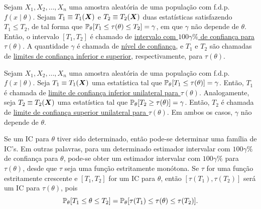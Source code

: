 

\begin{definition}
Sejam $X_1,X_2,\ldots,X_n$ uma amostra aleatória de uma população com f.d.p. $f(x\mid\theta)$. Sejam $T_1\equiv T_1(\v{X})$ e $T_2\equiv T_2(\v{X})$ duas estatísticas satisfazendo $T_1\leq T_2$, de tal forma que $\P_\theta[T_1\leq\tau(\theta)\leq T_2]=\gamma$, em que $\gamma$ não depende de $\theta$. Então, o intervalo $[T_1,T_2]$ é chamado de \underline{intervalo com $100\gamma\%$ de confiança para $\tau(\theta)$}. A quantidade $\gamma$ é chamada de \underline{nível de confiança}, e $T_1$ e $T_2$ são chamadas de \underline{limites de confiança inferior e superior}, respectivamente, para $\tau(\theta)$.
\end{definition}

\begin{definition}
Sejam $X_1,X_2,\ldots,X_n$ uma amostra aleatória de uma população com f.d.p. $f(x\mid\theta)$. Seja $T_1\equiv T_1(\v{X})$ uma estatística tal que $\P_\theta[T_1\leq\tau(\theta)]=\gamma$. Então, $T_1$ é chamada de \underline{limite de confiança inferior unilateral para $\tau(\theta)$}. Analogamente, seja $T_2\equiv T_2(\v{X})$ uma estatística tal que $\P_\theta[T_2\geq\tau(\theta)]=\gamma$. Então, $T_2$ é chamada de \underline{limite de confiança superior unilateral para $\tau(\theta)$}. Em ambos os casos, $\gamma$ não depende de $\theta$.
\end{definition}

\begin{note}
Se um IC para $\theta$ tiver sido determinado, então pode-se determinar uma família de IC's. Em outras palavras, para um determinado estimador intervalar com $100\gamma\%$ de confiança para $\theta$, pode-se obter um estimador intervalar com $100\gamma\%$ para $\tau(\theta)$, desde que $\tau$ seja uma função estritamente monótona. Se $\tau$ for uma função estritamente crescente e $[T_1,T_2]$ for um IC para $\theta$, então $[\tau(T_1),\tau(T_2)]$ será um IC para $\tau(\theta)$, pois
\begin{equation}
\P_\theta[T_1\leq\theta\leq T_2] = \P_\theta[\tau(T_1)\leq\tau(\theta)\leq\tau(T_2)].
\end{equation}
\end{note}

